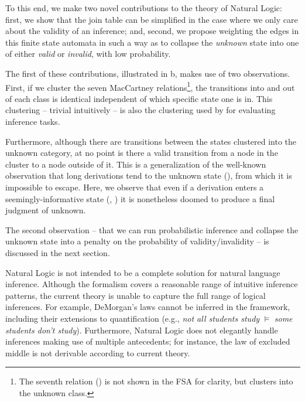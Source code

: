 To this end, we make two novel contributions to the theory of Natural
  Logic:
first, we show that the join table can be simplified in the case where
  we only care about the validity of an inference; and, second, we
  propose weighting the edges in this finite state automata in such
  a way as to collapse the \textit{unknown} state into one of 
  either \textit{valid} or \textit{invalid}, with low probability.

The first of these contributions, illustrated in b,
  makes use of two observations.
First, if we cluster the seven MacCartney relations\footnote{
  The seventh relation (\independent) is not shown in the FSA for
  clarity, but clusters into the unknown class.
  }, the transitions into and out of each class is identical independent
  of which specific state one is in.
This clustering -- trivial intuitively -- is also the clustering used
  by  for evaluating inference
  tasks.

Furthermore, although there are transitions between the states clustered
  into the unknown category, at no point is there a valid transition
  from a node in the cluster to a node outside of it.
This is a generalization of the well-known observation that long
  derivations tend to the unknown state (\independent), from which
  it is impossible to escape.
Here, we observe that even if a derivation enters a seemingly-informative
  state (\reverse, \cover) it is nonetheless doomed to produce a
  final judgment of unknown.

The second observation -- that we can run probabilistic inference and
  collapse the unknown state into a penalty on the probability of
  validity/invalidity -- is discussed in the next section.

%
%
Natural Logic is not intended to be a complete solution for natural
  language inference.
Although the formalism covers a reasonable range of intuitive inference
  patterns, the current theory is unable to capture the full range
  of logical inferences.
For example, DeMorgan's laws 
  cannot be inferred in the framework,
  including their extensions to quantification
  (e.g., \textit{not all students study} $\models$ \textit{some students don't study}).
Furthermore, Natural Logic does not elegantly handle inferences
  making use of multiple antecedents; for instance, the law of
  excluded middle is not derivable according to current theory.

